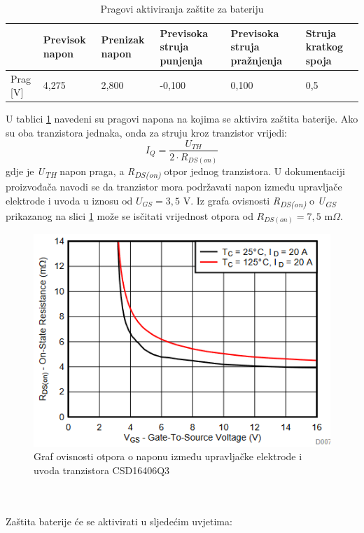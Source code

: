 \begin{table}[htbp]
    \centering
    \caption{Pragovi aktiviranja zaštite za bateriju \cite{ti:bq29700}}
    \begin{tabular}{|l|p{1.5cm}|p{1.5cm}|p{2.5cm}|p{2.5cm}|p{2.5cm}|} \hline
    \raggedright
    & Previsok napon & Prenizak napon & Previsoka struja punjenja & Previsoka struja pražnjenja & Struja kratkog spoja \\
    \hline
    Prag [V] & 4,275 & 2,800 & -0,100 & 0,100 & 0,5 \\
    \hline
    \end{tabular}%
    \label{tab:BQ29700}%
\end{table}%
U tablici \ref{tab:BQ29700} navedeni su pragovi napona na kojima se aktivira zaštita baterije. Ako su oba tranzistora jednaka, onda za struju kroz tranzistor vrijedi:
\begin{equation} \label{eq:TRANCUR}
    I_Q = \frac{U_{TH}}{2\cdot R_{DS(on)}}
\end{equation}
gdje je \textit{U\textsubscript{TH}} napon praga, a \textit{R\textsubscript{DS(on)}} otpor jednog tranzistora. U dokumentaciji proizvođača navodi se da tranzistor mora podržavati napon između upravljače elektrode i uvoda u iznosu od $U_{GS}=3,5\textrm{ V}$. Iz grafa ovisnosti \textit{R\textsubscript{DS(on)}} o \textit{U\textsubscript{GS}} prikazanog na slici \ref{slk:RDS_OLD} može se isčitati vrijednost otpora od $R_{DS(on)}=7,5\textrm{ m}\Omega$.
\begin{figure}[!hbt]
    \centering
    \includegraphics[width=10 cm]{Figures/RDS_OLD.PNG}
    \caption{Graf ovisnosti otpora o naponu između upravljačke elektrode i uvoda tranzistora CSD16406Q3 \cite{ti:csd1640}}
    \label{slk:RDS_OLD}
\end{figure}
\\~\\ Zaštita baterije će se aktivirati u sljedećim uvjetima:
